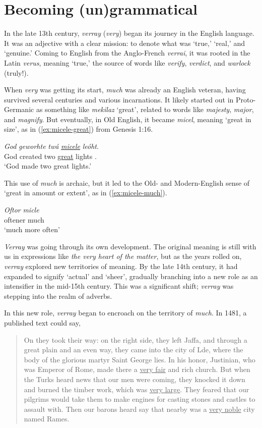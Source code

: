 \chapter{Becoming (un)grammatical}

In the late 13th century, \textit{verray} (\textit{very}) began its journey in the English language. It was an adjective with a clear mission: to denote what was `true,' `real,' and `genuine.' Coming to English from the Anglo-French \textit{verrai}, it was rooted in the Latin \textit{verus}, meaning `true,' the source of words like \textit{verify}, \textit{verdict}, and \textit{warlock} (truly!).

When \textit{very} was getting its start, \textit{much} was already an English veteran, having survived several centuries and various incarnations. It likely started out in Proto-Germanic as something like \textit{mekilaz}  `great', related to words like \textit{majesty}, \textit{major}, and \textit{magnify}. But eventually, in Old English, it became \textit{micel}, meaning `great in size', as in (\ref{ex:micele-great}) from Genesis 1:16.

\ea\label{ex:micele-great}
  \gll \textit{God} \textit{geworhte} \textit{twá} \uline{\textit{micele}} \textit{leóht}.\\
       God created two \uline{great} lights .\\
  \trans `God made two great lights.'
\z

This use of \textit{much} is archaic, but it led to the Old- and Modern-English sense of `great in amount or extent', as in (\ref{ex:micele-much}).

\ea\label{ex:micele-much}
  \gll \textit{Oftor} \textit{micle}\\
       oftener much\\
  \trans `much more often'
\z

\textit{Verray} was going through its own development. The original meaning is still with us in expressions like \textit{the very heart of the matter}, but as the years rolled on, \textit{verray} explored new territories of meaning. By the late 14th century, it had expanded to signify `actual' and `sheer', gradually branching into a new role as an intensifier in the mid-15th century. This was a significant shift; \textit{verray} was stepping into the realm of adverbs.

In this new role, \textit{verray} began to encroach on the territory of \textit{much}. In 1481, a published text could say, 
\begin{quote}
    On they took their way: on the right side, they left Jaffa, and through a great plain and an even way, they came into the city of Lde, where the body of the glorious martyr Saint George lies. In his honor, Justinian, who was Emperor of Rome, made there a \uline{very fair} and rich church. But when the Turks heard news that our men were coming, they knocked it down and burned the timber work, which was \uline{very large}. They feared that our pilgrims would take them to make engines for casting stones and castles to assault with. Then our barons heard say that nearby was a \uline{very noble} city named Rames.
\end{quote}

